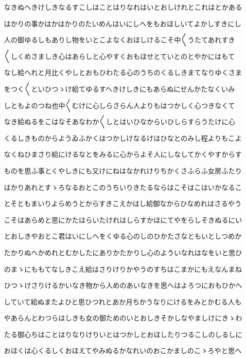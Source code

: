 \documentclass[a4paper,11pt,landscape]{ltjtarticle}
\begin{document}
なきぬへきけしきなるすこしはことはりなれはいとおしけれとこれはとかある
\par\medskip
はかりの事かはかはかりのたいめんはいにしへをもおほしいてよかしすきにし
\par\medskip
人の御ゆるしもありし物をいとこよなくおほしけるこそ中〱うたてあれすき
\par\medskip
〱しくめさましき心はあらしと心やすくおもほせとていとのとやかにはもて
\par\medskip
なし給へれと月比くやしとおもひわたる心のうちのくるしきまてなりゆくさま
\par\medskip
をつく〱といひつゝけ給てゆるすへきけしきにもあらぬにせんかたなくいみ
\par\medskip
しともよのつね也中〱むけに心しらさらん人よりもはつかしく心つきなくて
\par\medskip
なき給ぬるをこはなそあなわか〱しとはいひなからいひしらすらうたけに心
\par\medskip
くるしきものからようゐふかくはつかしけなるけはひなとのみし程よりもこよ
\par\medskip
なくねひまさり給にけるなとをみるに心からよそ人にしなしてかくやすからす
\par\medskip
ものを思ふ事とくやしきにも又けにねはなかれけりちかくさふらふ女房ふたり
\par\medskip
はかりあれとすゝろなるおとこのうちいりきたるならはこそはこはいかなるこ
\par\medskip
とそともまいりよらめうとからすきこえかはし給御なからひなめれはさるやう
\par\medskip
こそはあらめと思にかたはらいたけれはしらすかほにてやをらしそきぬるにい
\par\medskip
とおしきやおとこ君はいにしへをくゆる心のしのひかたさなともいとしつめか
\par\medskip
たかりぬへかめれとむかしたにありかたかりし心のよういなれはなをいと思ひ
\par\medskip
のまゝにももてなしきこえ給はさりけりかやうのすちはこまかにもえなんまね
\par\medskip
ひつゝけさりけるかいなき物から人めのあいなきを思へはよろつにおもひかへ
\par\medskip
していて給ぬまたよひと思ひつれとあか月ちかうなりにけるをみとかむる人も
\par\medskip
やあらんとわつらはしきも女の御ためのいとおしきそかしなやましけにきゝわ
\par\medskip
たる御心ちはことはりなりけりいとはつかしとおほしたりつるこしのしるしに
\par\medskip
おほくは心くるしくおほえてやみぬるかなれいのおこかましのこゝろやと思へ
\end{document}
